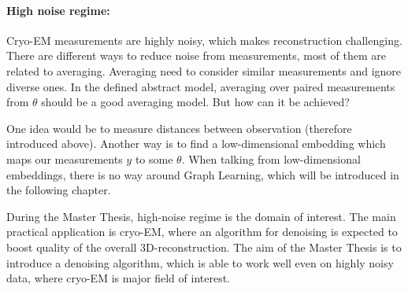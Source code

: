 \paragraph{High noise regime:}
Cryo-EM measurements are highly noisy, which makes reconstruction challenging. 
There are different ways to reduce noise from measurements, most of them are related to averaging. 
Averaging need to consider similar measurements and ignore diverse ones. 
In the defined abstract model, averaging over paired measurements from $\theta$ should be a good averaging model.
But how can it be achieved? 

One idea would be to measure distances between observation (therefore introduced above).
Another way is to find a low-dimensional embedding which maps our measurements $y$ to some $\theta$.
When talking from low-dimensional embeddings, there is no way around Graph Learning, which will be introduced
in the following chapter.

\begin{tcolorbox}[colback=red!5!white,colframe=red!75!black]
    During the Master Thesis, high-noise regime is the domain of interest.
    The main practical application is cryo-EM, where an algorithm for denoising is expected to boost
    quality of the overall 3D-reconstruction. 
    The aim of the Master Thesis is to introduce a denoising algorithm, which is able to work well even 
    on highly noisy data, where cryo-EM is major field of interest.
\end{tcolorbox}
